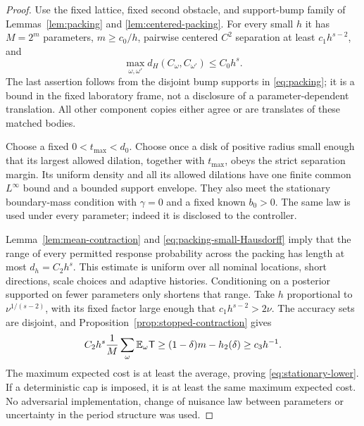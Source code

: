 \begin{proof}
Use the fixed lattice, fixed second obstacle, and support-bump family
of Lemmas~\ref{lem:packing} and \ref{lem:centered-packing}.
For every small $h$ it has $M=2^m$ parameters, $m\ge c_0/h$,
pairwise centered $C^2$ separation at least $c_1h^{s-2}$, and
\begin{equation}\label{eq:packing-small-Hausdorff}
                  \max_{\omega,\omega'}d_H(C_\omega,C_{\omega'})
                                         \le C_0h^s.
\end{equation}
The last assertion follows from the disjoint bump supports in
\eqref{eq:packing}; it is a bound in the fixed laboratory frame, not
a disclosure of a parameter-dependent translation. All other component
copies either agree or are translates of these matched bodies.

Choose a fixed $0<t_{\max}<d_0$. Choose once a disk of positive radius
small enough that its largest allowed dilation, together with $t_{\max}$,
obeys the strict separation margin. Its uniform density and all its
allowed dilations have one finite common $L^\infty$ bound and a bounded
support envelope. They also meet the stationary boundary-mass condition
with $\gamma=0$ and a fixed known $b_0>0$. The same law is used under
every parameter; indeed it is disclosed to the controller.

Lemma~\ref{lem:mean-contraction} and
\eqref{eq:packing-small-Hausdorff} imply that the range of every
permitted response probability across the packing has length at most
$d_h=C_2h^s$. This estimate is uniform over all nominal locations,
short directions, scale choices and adaptive histories. Conditioning
on a posterior supported on fewer parameters only shortens that range.
Take $h$ proportional to $\nu^{1/(s-2)}$, with its fixed factor
large enough that $c_1h^{s-2}>2\nu$. The accuracy sets are disjoint,
and Proposition~\ref{prop:stopped-contraction} gives
\[
 C_2h^s\frac1M\sum_\omega\mathbb E_\omega\mathsf T
       \ge (1-\delta)m-h_2(\delta)\ge c_3h^{-1}.
\]
The maximum expected cost is at least the average, proving
\eqref{eq:stationary-lower}. If a deterministic cap is imposed, it is
at least the same maximum expected cost. No adversarial implementation,
change of nuisance law between parameters or uncertainty in the period
structure was used.
\end{proof}

